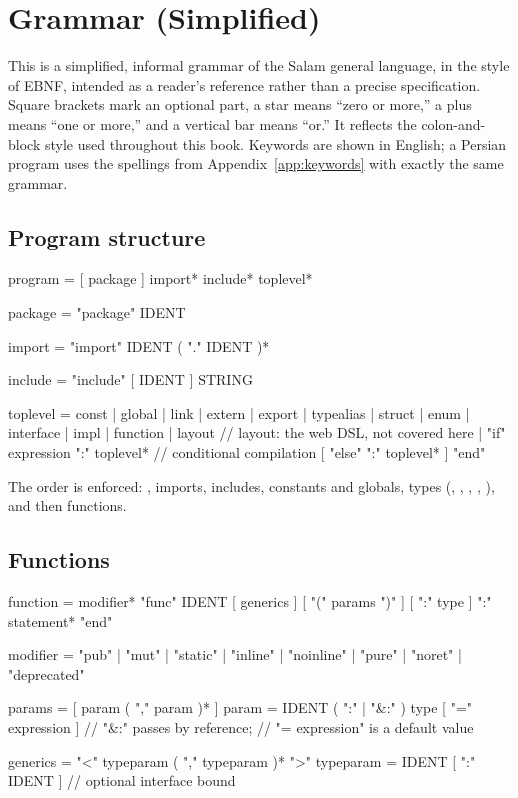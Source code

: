 \chapter{Grammar (Simplified)}%
\label{app:grammar}

This is a simplified, informal grammar of the Salam general language, in the style
of EBNF, intended as a reader's reference rather than a precise specification.
Square brackets \code{[ ]} mark an optional part, a star \code{*} means ``zero or
more,'' a plus \code{+} means ``one or more,'' and a vertical bar \code{|} means
``or.'' It reflects the colon-and- block style used throughout this book.
Keywords are shown in English; a Persian program uses the spellings from
Appendix~\ref{app:keywords} with exactly the same grammar.

\section*{Program structure}

\begin{shell}
program     = [ package ] import* include* toplevel*

package     = "package" IDENT

import      = "import" IDENT ( "." IDENT )*

include     = "include" [ IDENT ] STRING

toplevel    = const | global | link | extern | export
            | typealias | struct | enum | interface | impl
            | function | layout       // layout: the web DSL, not covered here
            | "if" expression ":" toplevel*         // conditional compilation
              [ "else" ":" toplevel* ] "end"
\end{shell}

\noindent The order is enforced: , imports, includes, constants and
globals, types (, , , ,
), and then functions.

\section*{Functions}

\begin{shell}
function    = modifier* "func" IDENT [ generics ] [ "(" params ")" ]
                  [ ":" type ] ":"
                  statement*
              "end"

modifier    = "pub" | "mut" | "static" | "inline" | "noinline"
            | "pure" | "noret" | "deprecated"

params      = [ param ( "," param )* ]
param       = IDENT ( ":" | "&:" ) type [ "=" expression ]
                                     // "&:" passes by reference;
                                     // "= expression" is a default value

generics    = "<" typeparam ( "," typeparam )* ">"
typeparam   = IDENT [ ":" IDENT ]          // optional interface bound
\end{shell}

